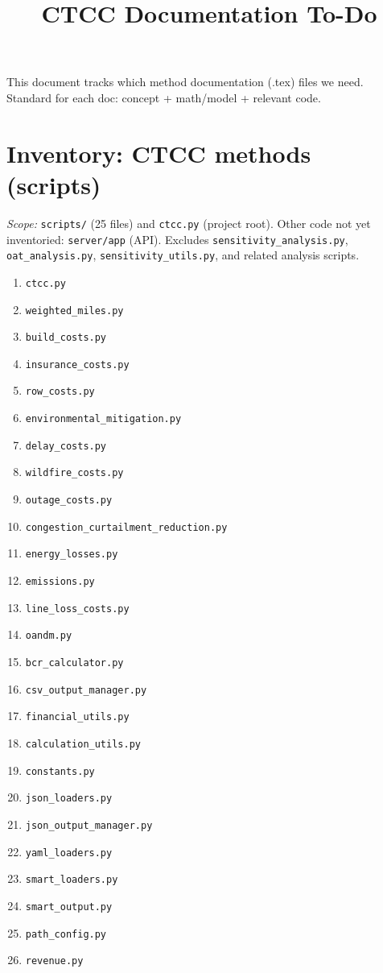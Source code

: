\documentclass[12pt]{article}
\title{CTCC Documentation To-Do}
\author{}
\date{}
\begin{document}
\maketitle

This document tracks which method documentation (.tex) files we need. Standard for each doc: concept + math/model + relevant code.

\section{Inventory: CTCC methods (scripts)}

\textit{Scope:} \texttt{scripts/} (25 files) and \texttt{ctcc.py} (project root). Other code not yet inventoried: \texttt{server/app} (API). Excludes \texttt{sensitivity\_analysis.py}, \texttt{oat\_analysis.py}, \texttt{sensitivity\_utils.py}, and related analysis scripts.

\begin{enumerate}
  \item \texttt{ctcc.py}
  \item \texttt{weighted\_miles.py}
  \item \texttt{build\_costs.py}
  \item \texttt{insurance\_costs.py}
  \item \texttt{row\_costs.py}
  \item \texttt{environmental\_mitigation.py}
  \item \texttt{delay\_costs.py}
  \item \texttt{wildfire\_costs.py}
  \item \texttt{outage\_costs.py}
  \item \texttt{congestion\_curtailment\_reduction.py}
  \item \texttt{energy\_losses.py}
  \item \texttt{emissions.py}
  \item \texttt{line\_loss\_costs.py}
  \item \texttt{oandm.py}
  \item \texttt{bcr\_calculator.py}
  \item \texttt{csv\_output\_manager.py}
  \item \texttt{financial\_utils.py}
  \item \texttt{calculation\_utils.py}
  \item \texttt{constants.py}
  \item \texttt{json\_loaders.py}
  \item \texttt{json\_output\_manager.py}
  \item \texttt{yaml\_loaders.py}
  \item \texttt{smart\_loaders.py}
  \item \texttt{smart\_output.py}
  \item \texttt{path\_config.py}
  \item \texttt{revenue.py}
\end{enumerate}
\end{document}
